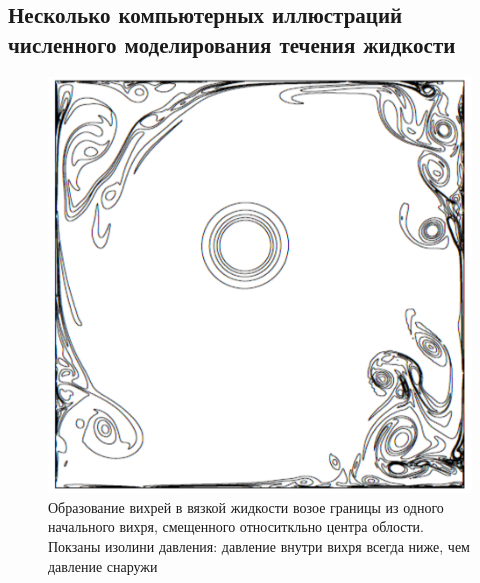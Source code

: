 


\subsection*{Несколько компьютерных иллюстраций численного моделирования течения жидкости}
\begin{figure}[htp]
\centering
\includegraphics[width=0.7\linewidth]{historyImg/vortex_small.pdf}
\caption{Образование вихрей в вязкой жидкости возое границы из одного начального вихря, смещенного относиткльно центра облости. Покзаны изолини давления:  давление внутри вихря всегда ниже, чем давление снаружи}
\end{figure}


